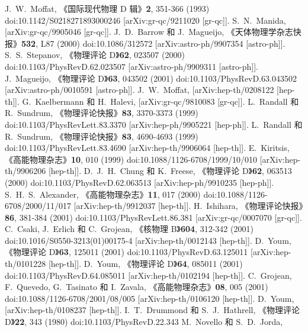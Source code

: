 \documentclass[jkps,preprint,fleqn]{revtex4}
\begin{document}
\begin{thebibliography}{999}
J.~W.~Moffat,
《国际现代物理 D 辑》\textbf{2}, 351-366 (1993)
doi:10.1142/S0218271893000246
[arXiv:gr-qc/9211020 [gr-qc]].
S.~N.~Manida,
[arXiv:gr-qc/9905046 [gr-qc]].
J.~D.~Barrow 和 J.~Magueijo,
《天体物理学杂志快报》\textbf{532}, L87 (2000)
doi:10.1086/312572
[arXiv:astro-ph/9907354 [astro-ph]].
S.~S.~Stepanov,
《物理评论 D》\textbf{62}, 023507 (2000)
doi:10.1103/PhysRevD.62.023507
[arXiv:astro-ph/9909311 [astro-ph]].
J.~Magueijo,
《物理评论 D》\textbf{63}, 043502 (2001)
doi:10.1103/PhysRevD.63.043502
[arXiv:astro-ph/0010591 [astro-ph]].
J.~W.~Moffat,
[arXiv:hep-th/0208122 [hep-th]].
G.~Kaelbermann 和 H.~Halevi,
[arXiv:gr-qc/9810083 [gr-qc]].
L.~Randall 和 R.~Sundrum,
《物理评论快报》\textbf{83}, 3370-3373 (1999)
doi:10.1103/PhysRevLett.83.3370
[arXiv:hep-ph/9905221 [hep-ph]].
L.~Randall 和 R.~Sundrum,
《物理评论快报》\textbf{83}, 4690-4693 (1999)
doi:10.1103/PhysRevLett.83.4690
[arXiv:hep-th/9906064 [hep-th]].
E.~Kiritsis,
《高能物理杂志》\textbf{10}, 010 (1999)
doi:10.1088/1126-6708/1999/10/010
[arXiv:hep-th/9906206 [hep-th]].
D.~J.~H.~Chung 和 K.~Freese,
《物理评论 D》\textbf{62}, 063513 (2000)
doi:10.1103/PhysRevD.62.063513
[arXiv:hep-ph/9910235 [hep-ph]].
S.~H.~S.~Alexander,
《高能物理杂志》\textbf{11}, 017 (2000)
doi:10.1088/1126-6708/2000/11/017
[arXiv:hep-th/9912037 [hep-th]].
H.~Ishihara,
《物理评论快报》\textbf{86}, 381-384 (2001)
doi:10.1103/PhysRevLett.86.381
[arXiv:gr-qc/0007070 [gr-qc]].
C.~Csaki, J.~Erlich 和 C.~Grojean,
《核物理 B》\textbf{604}, 312-342 (2001)
doi:10.1016/S0550-3213(01)00175-4
[arXiv:hep-th/0012143 [hep-th]].
D.~Youm,
《物理评论 D》\textbf{63}, 125011 (2001)
doi:10.1103/PhysRevD.63.125011
[arXiv:hep-th/0101228 [hep-th]].
D.~Youm,
《物理评论 D》\textbf{64}, 085011 (2001)
doi:10.1103/PhysRevD.64.085011
[arXiv:hep-th/0102194 [hep-th]].
C.~Grojean, F.~Quevedo, G.~Tasinato 和 I.~Zavala,
《高能物理杂志》\textbf{08}, 005 (2001)
doi:10.1088/1126-6708/2001/08/005
[arXiv:hep-th/0106120 [hep-th]].
D.~Youm,
[arXiv:hep-th/0108237 [hep-th]].
I.~T.~Drummond 和 S.~J.~Hathrell,
《物理评论 D》\textbf{22}, 343 (1980)
doi:10.1103/PhysRevD.22.343
M.~Novello 和 S.~D.~Jorda,

\end{thebibliography}
\end{document}
